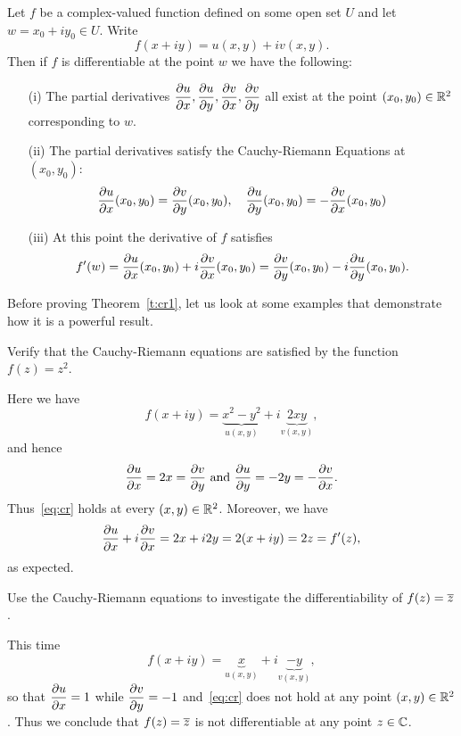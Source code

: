 \begin{theorem}
\label{t:cr1}

Let $f$ be a complex-valued function defined on some open set $U$ and let $w=x_0+iy_0 \in U$.  Write
\[
f(x+iy) = u(x,y)+iv(x,y).
\]
Then if $f$ is differentiable at the point $w$ we have the following:

\begin{enumerate}
\item[(i)] The partial derivatives $\dfrac{\partial u}{\partial x}, \dfrac{\partial u}{\partial y}, \dfrac{\partial v}{\partial x}, \dfrac{\partial v}{\partial y}$ all exist at the point $(x_0,y_0) \in \mathbb{R}^2$ corresponding to $w$.
\item[(ii)] The partial derivatives satisfy the Cauchy-Riemann Equations at $(x_0,y_0)$:
\begin{equation}
\label{eq:cr}
\dfrac{\partial u}{\partial x} (x_0,y_0) = \dfrac{\partial v}{\partial y} (x_0,y_0),\quad \dfrac{\partial u}{\partial y} (x_0,y_0) = - \dfrac{\partial v}{\partial x} (x_0,y_0)
\end{equation}
\item[(iii)] At this point  the derivative of $f$ satisfies
\[
f'(w)= \dfrac{\partial u}{\partial x} (x_0,y_0) + i \dfrac{\partial v}{\partial x} (x_0,y_0) = \dfrac{\partial v}{\partial y} (x_0,y_0) - i \dfrac{\partial u}{\partial y} (x_0,y_0).
\]
\end{enumerate}
\end{theorem}

Before proving Theorem~\ref{t:cr1}, let us look at some examples that demonstrate how it is a powerful result.



\begin{example}
 Verify that the Cauchy-Riemann equations are satisfied by the function  $f(z)=z^2$.\\
\end{example}

Here we have
\[
f(x+iy) = \underbrace{x^2-y^2}_{u(x,y)} + i \underbrace{2xy}_{v(x,y)},
\]
and hence
\[
\dfrac{\partial u}{\partial x} = 2x = \dfrac{\partial v}{\partial y} \text{ and } \dfrac{\partial u}{\partial y} = -2y = - \dfrac{\partial v}{\partial x}.
\]
Thus~\eqref{eq:cr} holds at every $(x,y) \in \mathbb{R}^2$.  Moreover, we have
\[
\dfrac{\partial u}{\partial x} + i \dfrac{\partial v}{\partial x} = 2x+i2y = 2(x+iy) = 2z = f'(z),
\]
as expected.

\begin{example} 
Use the Cauchy-Riemann equations to investigate the differentiability of $f(z)=\overline{z}$.
\end{example}

This time
\[
f(x+iy) = \underbrace{x}_{u(x,y)} + i \underbrace{-y}_{v(x,y)},
\]
so that $\dfrac{\partial u}{\partial x} = 1$ while $\dfrac{\partial v}{\partial y}=-1$ and~\eqref{eq:cr} does not hold at any point $(x,y) \in \mathbb{R}^2$.
 Thus we conclude that $f(z) = \overline{z}$ is not differentiable at any point $ z \in \mathbb{C}$.

